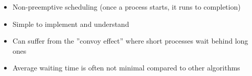 \documentclass{article}
\begin{document}
\begin{itemize}
  \item Non-preemptive scheduling (once a process starts, it runs to completion)
  \item Simple to implement and understand
  \item Can suffer from the ''convoy effect'' where short processes wait behind long ones
  \item Average waiting time is often not minimal compared to other algorithms
\end{itemize}
\end{document}
